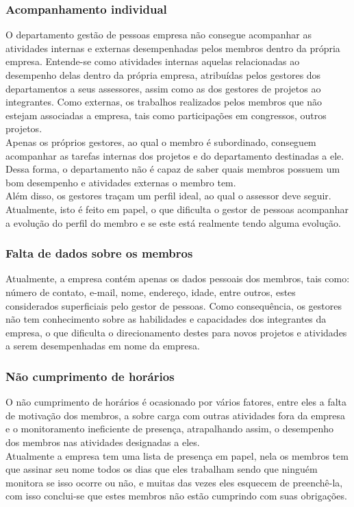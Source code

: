 \begin{anexosenv}
\subsubsection[Acompanhamento individual]{Acompanhamento individual}


O departamento gestão de pessoas empresa não consegue acompanhar as atividades internas e externas desempenhadas pelos membros dentro da própria empresa. Entende-se como atividades internas aquelas relacionadas ao desempenho delas dentro da própria empresa, atribuídas pelos gestores dos departamentos a seus assessores, assim como as dos gestores de projetos ao integrantes. Como externas, os trabalhos realizados pelos membros que não estejam associadas a empresa, tais como participações em congressos, outros projetos.\\
Apenas os próprios gestores, ao qual o membro é subordinado, conseguem acompanhar as tarefas internas dos projetos e do departamento destinadas a ele. Dessa forma, o departamento não é capaz de saber quais membros possuem um bom desempenho e atividades externas o membro tem.\\
Além disso, os gestores traçam um perfil ideal, ao qual o assessor deve seguir. Atualmente, isto é feito em papel, o que dificulta o gestor de pessoas acompanhar a evolução do perfil do membro e se este está realmente tendo alguma evolução.\\

\subsubsection[Falta de dados sobre os membros]{Falta de dados sobre os membros}

Atualmente, a empresa contém apenas os dados pessoais dos membros, tais como: número de contato, e-mail, nome, endereço, idade, entre outros, estes  considerados superficiais pelo gestor de pessoas.  Como consequência, os gestores não tem conhecimento sobre as habilidades e capacidades dos integrantes da empresa, o que dificulta o direcionamento destes para novos projetos e atividades a serem desempenhadas em nome da empresa.\\

\subsubsection[Não cumprimento de horários]{Não cumprimento de horários}


O não cumprimento de horários é ocasionado por vários fatores, entre eles a falta de motivação dos membros, a sobre carga com outras atividades fora da empresa e o monitoramento ineficiente de presença, atrapalhando assim, o desempenho dos membros nas atividades designadas a eles.\\
Atualmente a empresa tem uma lista de presença em papel, nela os membros tem que assinar seu nome todos os dias que eles trabalham sendo que ninguém monitora se isso ocorre ou não, e muitas das vezes eles esquecem de preenchê-la, com isso conclui-se que estes membros não estão cumprindo com suas obrigações.\\


\end{anexosenv}
